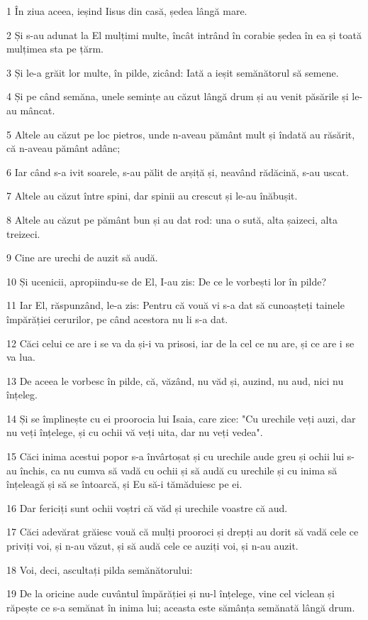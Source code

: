 \par 1 În ziua aceea, ieșind Iisus din casă, ședea lângă mare.
\par 2 Și s-au adunat la El mulțimi multe, încât intrând în corabie ședea în ea și toată mulțimea sta pe țărm.
\par 3 Și le-a grăit lor multe, în pilde, zicând: Iată a ieșit semănătorul să semene.
\par 4 Și pe când semăna, unele semințe au căzut lângă drum și au venit păsările și le-au mâncat.
\par 5 Altele au căzut pe loc pietros, unde n-aveau pământ mult și îndată au răsărit, că n-aveau pământ adânc;
\par 6 Iar când s-a ivit soarele, s-au pălit de arșiță și, neavând rădăcină, s-au uscat.
\par 7 Altele au căzut între spini, dar spinii au crescut și le-au înăbușit.
\par 8 Altele au căzut pe pământ bun și au dat rod: una o sută, alta șaizeci, alta treizeci.
\par 9 Cine are urechi de auzit să audă.
\par 10 Și ucenicii, apropiindu-se de El, I-au zis: De ce le vorbești lor în pilde?
\par 11 Iar El, răspunzând, le-a zis: Pentru că vouă vi s-a dat să cunoașteți tainele împărăției cerurilor, pe când acestora nu li s-a dat.
\par 12 Căci celui ce are i se va da și-i va prisosi, iar de la cel ce nu are, și ce are i se va lua.
\par 13 De aceea le vorbesc în pilde, că, văzând, nu văd și, auzind, nu aud, nici nu înțeleg.
\par 14 Și se împlinește cu ei proorocia lui Isaia, care zice: "Cu urechile veți auzi, dar nu veți înțelege, și cu ochii vă veți uita, dar nu veți vedea".
\par 15 Căci inima acestui popor s-a învârtoșat și cu urechile aude greu și ochii lui s-au închis, ca nu cumva să vadă cu ochii și să audă cu urechile și cu inima să înțeleagă și să se întoarcă, și Eu să-i tămăduiesc pe ei.
\par 16 Dar fericiți sunt ochii voștri că văd și urechile voastre că aud.
\par 17 Căci adevărat grăiesc vouă că mulți prooroci și drepți au dorit să vadă cele ce priviți voi, și n-au văzut, și să audă cele ce auziți voi, și n-au auzit.
\par 18 Voi, deci, ascultați pilda semănătorului:
\par 19 De la oricine aude cuvântul împărăției și nu-l înțelege, vine cel viclean și răpește ce s-a semănat în inima lui; aceasta este sămânța semănată lângă drum.
